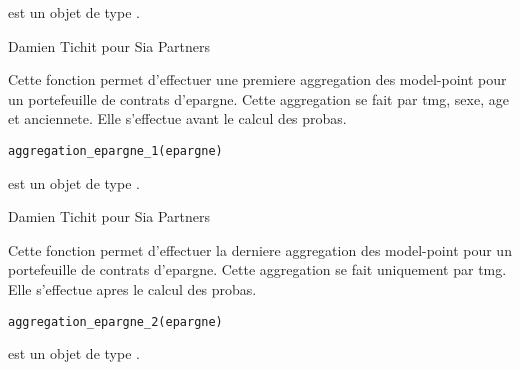 \documentclass[a4paper]{book}
\begin{document}
%
\begin{Arguments}
\begin{ldescription}
\item[\code{alm}] est un objet de type .
\end{ldescription}
\end{Arguments}
%
\begin{Author}\relax
Damien Tichit pour Sia Partners
\end{Author}
%
\begin{Description}\relax
Cette fonction permet d'effectuer une premiere aggregation des model-point pour un portefeuille de contrats d'epargne.
Cette aggregation se fait par tmg, sexe, age et anciennete. Elle s'effectue avant le calcul des probas.
\end{Description}
%
\begin{Usage}
\begin{verbatim}
aggregation_epargne_1(epargne)
\end{verbatim}
\end{Usage}
%
\begin{Arguments}
\begin{ldescription}
\item[\code{epargne}] est un objet de type .
\end{ldescription}
\end{Arguments}
%
\begin{Author}\relax
Damien Tichit pour Sia Partners
\end{Author}
%
\begin{Description}\relax
Cette fonction permet d'effectuer la derniere aggregation des model-point pour un portefeuille de contrats d'epargne.
Cette aggregation se fait uniquement par tmg. Elle s'effectue apres le calcul des probas.
\end{Description}
%
\begin{Usage}
\begin{verbatim}
aggregation_epargne_2(epargne)
\end{verbatim}
\end{Usage}
%
\begin{Arguments}
\begin{ldescription}
\item[\code{epargne}] est un objet de type .
\end{ldescription}
\end{Arguments}
\end{document}
